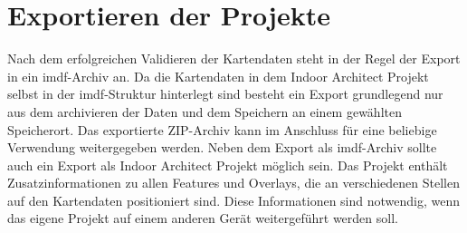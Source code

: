 \section{Exportieren der Projekte}
Nach dem erfolgreichen Validieren der Kartendaten steht in der Regel der Export in ein \ac{imdf}-Archiv an.
Da die Kartendaten in dem Indoor Architect Projekt selbst in der \ac{imdf}-Struktur hinterlegt sind besteht ein Export grundlegend nur aus dem archivieren der Daten und dem Speichern an einem gewählten Speicherort.
Das exportierte ZIP-Archiv kann im Anschluss für eine beliebige Verwendung weitergegeben werden.\pbreak%
%
Neben dem Export als \ac{imdf}-Archiv sollte auch ein Export als Indoor Architect Projekt möglich sein.
Das Projekt enthält Zusatzinformationen zu allen Features und Overlays, die an verschiedenen Stellen auf den Kartendaten positioniert sind.
Diese Informationen sind notwendig, wenn das eigene Projekt auf einem anderen Gerät weitergeführt werden soll.
